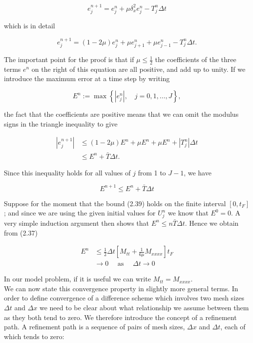 \documentclass[10pt]{article}
\begin{document}
\[
e_{j}^{n+1}=e_{j}^{n}+\mu \delta_{x}^{2} e_{j}^{n}-T_{j}^{n} \Delta t
\]

which is in detail

\[
e_{j}^{n+1}=(1-2 \mu) e_{j}^{n}+\mu e_{j+1}^{n}+\mu e_{j-1}^{n}-T_{j}^{n} \Delta t .
\]

The important point for the proof is that if \(\mu \leq \frac{1}{2}\) the coefficients of the three terms \(e^{n}\) on the right of this equation are all positive, and add up to unity. If we introduce the maximum error at a time step by writing

\[
E^{n}:=\max \left\{\left|e_{j}^{n}\right|, \quad j=0,1, \ldots, J\right\},
\]

the fact that the coefficients are positive means that we can omit the modulus signs in the triangle inequality to give

\[
\begin{aligned}
\left|e_{j}^{n+1}\right| & \leq(1-2 \mu) E^{n}+\mu E^{n}+\mu E^{n}+\left|T_{j}^{n}\right| \Delta t \\
& \leq E^{n}+\bar{T} \Delta t .
\end{aligned}
\]

Since this inequality holds for all values of \(j\) from 1 to \(J-1\), we have

\[
E^{n+1} \leq E^{n}+\bar{T} \Delta t
\]

Suppose for the moment that the bound (2.39) holds on the finite interval \(\left[0, t_{F}\right]\); and since we are using the given initial values for \(U_{j}^{n}\) we know that \(E^{0}=0\). A very simple induction argument then shows that \(E^{n} \leq n \bar{T} \Delta t\). Hence we obtain from (2.37)

\[
\begin{aligned}
E^{n} & \leq \frac{1}{2} \Delta t\left[M_{t t}+\frac{1}{6 \mu} M_{x x x x}\right] t_{F} \\
& \rightarrow 0 \quad \text { as } \quad \Delta t \rightarrow 0
\end{aligned}
\]

In our model problem, if it is useful we can write \(M_{t t}=M_{x x x x}\).\\
We can now state this convergence property in slightly more general terms. In order to define convergence of a difference scheme which involves two mesh sizes \(\Delta t\) and \(\Delta x\) we need to be clear about what relationship we assume between them as they both tend to zero. We therefore introduce the concept of a refinement path. A refinement path is a sequence of pairs of mesh sizes, \(\Delta x\) and \(\Delta t\), each of which tends to zero:
\end{document}
